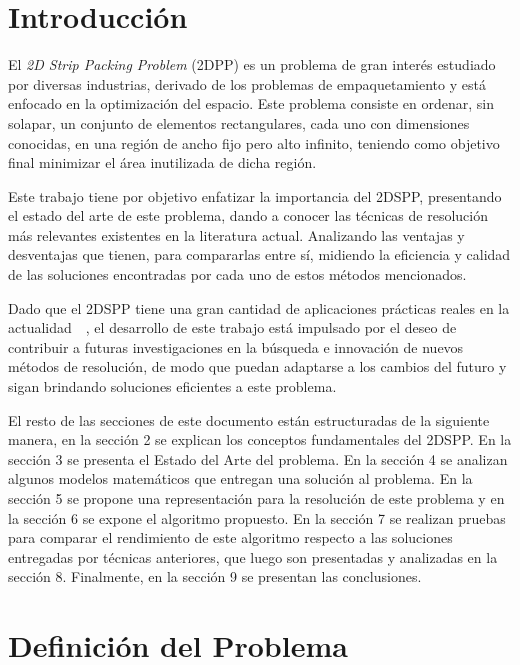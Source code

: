 \documentclass[letter, 10pt]{article}
\begin{document}
\section{Introducci\'on}

El \emph{2D Strip Packing Problem} (2DPP) es un problema de gran inter\'es estudiado por diversas industrias, derivado de los problemas de empaquetamiento y est\'a enfocado en la optimizaci\'on del espacio. Este problema consiste en ordenar, sin solapar, un conjunto de elementos rectangulares, cada uno con dimensiones conocidas, en una regi\'on de ancho fijo pero alto infinito, teniendo como objetivo final minimizar el \'area inutilizada de dicha regi\'on.

Este trabajo tiene por objetivo enfatizar la importancia del 2DSPP, presentando el estado del arte de este problema, dando a conocer las t\'ecnicas de resoluci\'on m\'as relevantes existentes en la literatura actual. Analizando las ventajas y desventajas que tienen, para compararlas entre s\'i, midiendo la eficiencia y calidad de las soluciones encontradas por cada uno de estos m\'etodos mencionados.

Dado que el 2DSPP tiene una gran cantidad de aplicaciones pr\'acticas reales en la actualidad~\cite{junior2022rectangular}~\cite{vasilyev2023generalized}, el desarrollo de este trabajo est\'a impulsado por el deseo de contribuir a futuras investigaciones en la b\'usqueda e innovaci\'on de nuevos m\'etodos de resoluci\'on, de modo que puedan adaptarse a los cambios del futuro y sigan brindando soluciones eficientes a este problema.

El resto de las secciones de este documento est\'an estructuradas de la siguiente manera, en la secci\'on 2 se explican los conceptos fundamentales del 2DSPP. En la secci\'on 3 se presenta el Estado del Arte del problema. En la secci\'on 4 se analizan algunos modelos matem\'aticos que entregan una soluci\'on al problema. En la secci\'on 5 se propone una representaci\'on para la resoluci\'on de este problema y en la secci\'on 6 se expone el algoritmo propuesto. En la secci\'on 7 se realizan pruebas para comparar el rendimiento de este algoritmo respecto a las soluciones entregadas por t\'ecnicas anteriores, que luego son presentadas y analizadas en la secci\'on 8. Finalmente, en la secci\'on 9 se presentan las conclusiones.

\section{Definici\'on del Problema}
\end{document}
